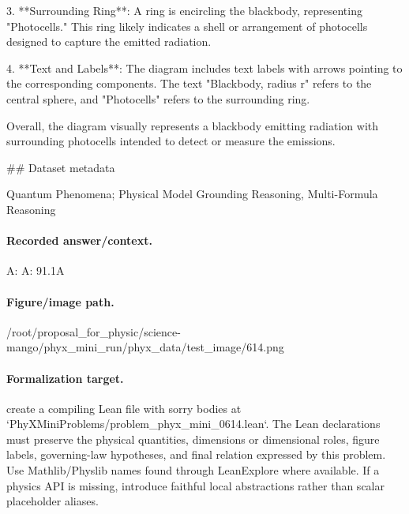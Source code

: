3. **Surrounding Ring**: A ring is encircling the blackbody, representing "Photocells." This ring likely indicates a shell or arrangement of photocells designed to capture the emitted radiation.

4. **Text and Labels**: The diagram includes text labels with arrows pointing to the corresponding components. The text "Blackbody, radius r" refers to the central sphere, and "Photocells" refers to the surrounding ring.

Overall, the diagram visually represents a blackbody emitting radiation with surrounding photocells intended to detect or measure the emissions.

\#\# Dataset metadata

Quantum Phenomena; Physical Model Grounding Reasoning, Multi-Formula Reasoning

\paragraph{Recorded answer/context.}
A: A: 91.1A

\paragraph{Figure/image path.}
/root/proposal\_for\_physic/science-mango/phyx\_mini\_run/phyx\_data/test\_image/614.png

\paragraph{Formalization target.}
create a compiling Lean file with sorry bodies at `PhyXMiniProblems/problem\_phyx\_mini\_0614.lean`. The Lean declarations must preserve the physical quantities, dimensions or dimensional roles, figure labels, governing-law hypotheses, and final relation expressed by this problem.
Use Mathlib/Physlib names found through LeanExplore where available. If a physics API is missing, introduce faithful local abstractions rather than scalar placeholder aliases.

